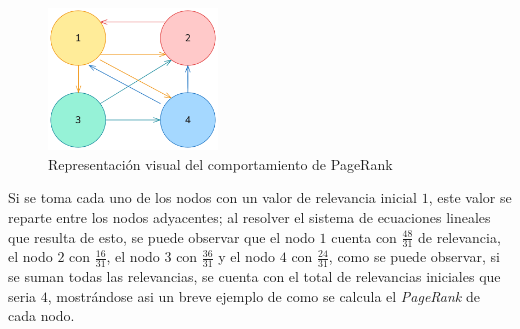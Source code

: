 \begin{figure}[h!]
    \centering
    \includegraphics[width=0.4\textwidth]{src/figures/pageRank.png}
    \caption{Representación visual del comportamiento de PageRank}
    \label{fig:page_rank}
\end{figure}

Si se toma cada uno de los nodos con un valor de relevancia inicial $1$, este valor se reparte entre los nodos adyacentes; al resolver el sistema de ecuaciones lineales que resulta de esto, se puede observar que el nodo $1$ cuenta con $\frac{48}{31}$ de relevancia, el nodo $2$ con $\frac{16}{31}$, el nodo $3$ con $\frac{36}{31}$ y el nodo $4$ con $\frac{24}{31}$, como se puede observar, si se suman todas las relevancias, se cuenta con el total de relevancias iniciales que seria $4$, mostrándose asi un breve ejemplo de como se calcula el \textit{PageRank} de cada nodo.